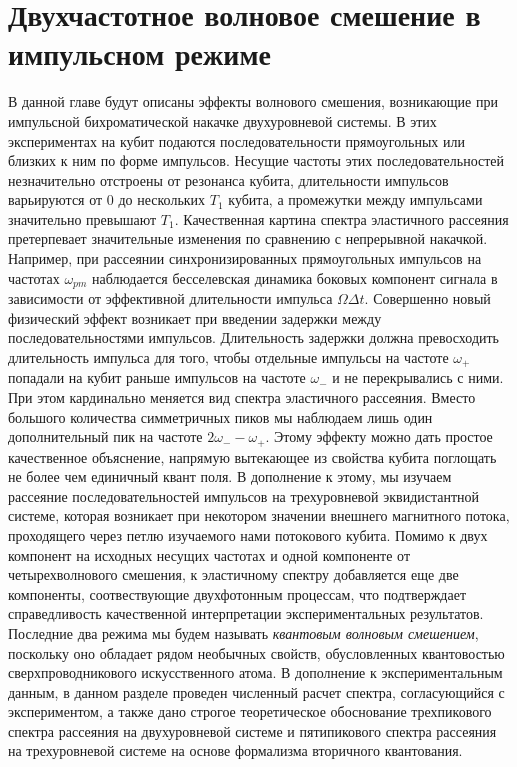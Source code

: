 \chapter{Двухчастотное волновое смешение в импульсном режиме}
\label{ch: q_mixing}

В данной главе будут описаны эффекты волнового смешения, возникающие при импульсной бихроматической накачке двухуровневой системы. В этих экспериментах на кубит подаются последовательности прямоугольных или близких к ним по форме импульсов. Несущие частоты этих последовательностей незначительно отстроены от резонанса кубита, длительности импульсов варьируются от $0$ до нескольких $T_1$ кубита, а промежутки между импульсами значительно превышают $T_1$. Качественная картина спектра эластичного рассеяния претерпевает значительные изменения по сравнению с непрерывной накачкой. Например, при рассеянии синхронизированных прямоугольных импульсов на частотах $\omega_{pm}$ наблюдается бесселевская динамика боковых компонент сигнала в зависимости от эффективной длительности импульса $\Omega\Delta t$. Совершенно новый физический эффект возникает при введении задержки между последовательностями импульсов. Длительность задержки должна превосходить длительность импульса для того, чтобы отдельные импульсы на частоте $\omega_+$ попадали на кубит раньше импульсов на частоте $\omega_-$ и не перекрывались с ними. При этом кардинально меняется вид спектра эластичного рассеяния. Вместо большого количества симметричных пиков мы наблюдаем лишь один дополнительный пик на частоте $2\omega_--\omega_+$. Этому эффекту можно дать простое качественное объяснение, напрямую вытекающее из свойства кубита поглощать не более чем единичный квант поля. В дополнение к этому, мы изучаем рассеяние последовательностей импульсов на трехуровневой эквидистантной системе, которая возникает при некотором значении внешнего магнитного потока, проходящего через петлю изучаемого нами потокового кубита. Помимо к двух компонент на исходных несущих частотах и одной компоненте от четырехволнового смешения, к эластичному спектру добавляется еще две компоненты, соотвествующие двухфотонным процессам, что подтверждает справедливость качественной интерпретации экспериментальных результатов. Последние два режима мы будем называть \textit{квантовым волновым смешением}, поскольку оно обладает рядом необычных свойств, обусловленных квантовостью сверхпроводникового искусственного атома. В дополнение к экспериментальным данным, в данном разделе проведен численный расчет спектра, согласующийся с экспериментом, а также дано строгое теоретическое обоснование трехпикового спектра рассеяния на двухуровневой системе и пятипикового спектра рассеяния на трехуровневой системе на основе формализма вторичного квантования.  
